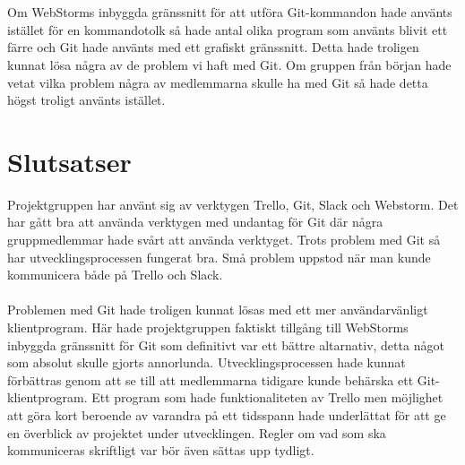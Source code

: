 \\ \\
Om WebStorms inbyggda gränssnitt för att utföra Git-kommandon hade använts istället för en   kommandotolk så hade antal olika program som använts blivit ett färre och Git hade använts med ett grafiskt gränssnitt. Detta hade troligen kunnat lösa några av de problem vi haft med Git. Om gruppen från början hade vetat vilka problem några av medlemmarna skulle ha med Git så hade detta högst troligt använts istället.

\section{Slutsatser}
\label{cha:jonathan-slutsatser}

Projektgruppen har använt sig av verktygen Trello, Git, Slack och Webstorm. Det har gått bra att använda verktygen med undantag för Git där några gruppmedlemmar hade svårt att använda verktyget. Trots problem med Git så har utvecklingsprocessen fungerat bra. Små problem uppstod när man kunde kommunicera både på Trello och Slack.
\\\\
Problemen med Git hade troligen kunnat lösas med ett mer användarvänligt klientprogram. Här hade projektgruppen faktiskt tillgång till WebStorms inbyggda gränssnitt för Git som definitivt var ett bättre altarnativ, detta något som absolut skulle gjorts annorlunda. Utvecklingsprocessen hade kunnat förbättras genom att se till att medlemmarna tidigare kunde behärska ett Git-klientprogram. Ett program som hade funktionaliteten av Trello men möjlighet att göra kort beroende av varandra på ett tidsspann hade underlättat för att ge en överblick av projektet under utvecklingen. Regler om vad som ska kommuniceras skriftligt var bör även sättas upp tydligt.
